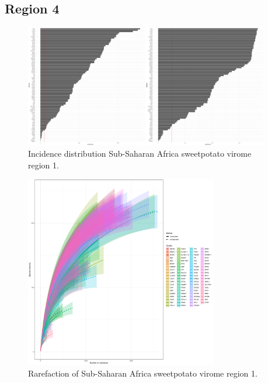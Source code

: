 \documentclass{article}
\begin{document}
\subsection{Region 4}

\begin{figure}[h!]
\begin{center}
\includegraphics[width=0.95\textwidth]{../results/k-cluster4/4-kcluster_incidence_w+bFeb28.pdf
} %
\caption{Incidence distribution Sub-Saharan Africa sweetpotato virome region 1.}
\end{center}
\end{figure}


\begin{figure}[h!]
\begin{center}
\includegraphics[width=0.75\textwidth]{../results/k-cluster4/4-kcluster_rarefaction-iNEXT_Feb28.pdf
} %
\caption{Rarefaction of Sub-Saharan Africa sweetpotato virome region 1.}
\end{center}
\end{figure}
\end{document}
